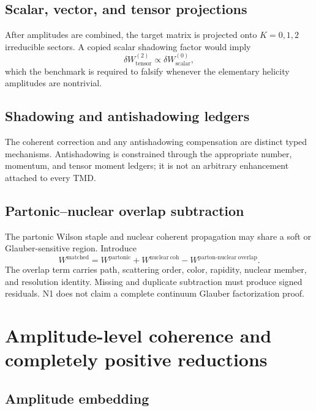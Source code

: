 \documentclass[11pt]{article}
\begin{document}
\subsection{Scalar, vector, and tensor projections}

After amplitudes are combined, the target matrix is projected onto
\(K=0,1,2\) irreducible sectors.  A copied scalar shadowing factor would imply
\begin{equation}
 \delta W^{(2)}_{\mathrm{tensor}}
 \propto
 \delta W^{(0)}_{\mathrm{scalar}},
 \label{eq:copied-shadowing-ansatz}
\end{equation}
which the benchmark is required to falsify whenever the elementary helicity
amplitudes are nontrivial.

\subsection{Shadowing and antishadowing ledgers}

The coherent correction and any antishadowing compensation are distinct typed
mechanisms.  Antishadowing is constrained through the appropriate number,
momentum, and tensor moment ledgers; it is not an arbitrary enhancement
attached to every TMD.

\subsection{Partonic--nuclear overlap subtraction}

The partonic Wilson staple and nuclear coherent propagation may share a soft
or Glauber-sensitive region.  Introduce
\begin{equation}
 W^{\mathrm{matched}}
 =W^{\mathrm{partonic}}
 +W^{\mathrm{nuclear\ coh}}
 -W^{\mathrm{parton\text{-}nuclear\ overlap}}.
 \label{eq:parton-nuclear-subtraction}
\end{equation}
The overlap term carries path, scattering order, color, rapidity, nuclear
member, and resolution identity.  Missing and duplicate subtraction must
produce signed residuals.  N1 does not claim a complete continuum Glauber
factorization proof.

\section{Amplitude-level coherence and completely positive reductions}
\label{sec:cp}

\subsection{Amplitude embedding}
\end{document}

